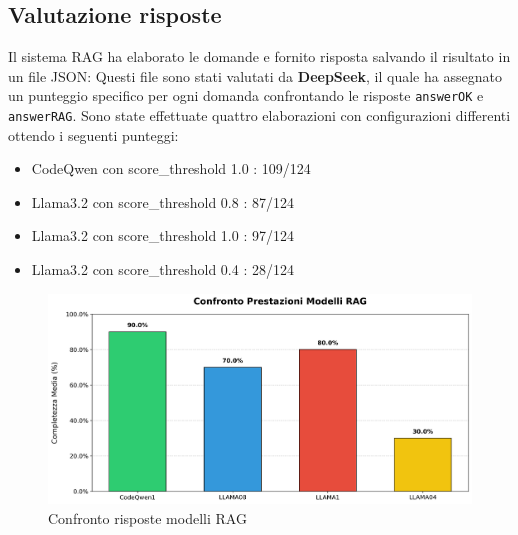 \documentclass[12pt,a4paper,openright,twoside]{book}
\begin{document}
\subsection{Valutazione risposte}
Il sistema RAG ha elaborato le domande e fornito risposta salvando il risultato in un file JSON:
Questi file sono stati valutati da \textbf{DeepSeek}, il quale ha assegnato un punteggio specifico per ogni domanda confrontando le risposte \texttt{answerOK} e \texttt{answerRAG}.
Sono state effettuate quattro elaborazioni con configurazioni differenti ottendo i seguenti punteggi:
\begin{itemize}
    \item CodeQwen con score\_threshold 1.0 : 109/124
    \item Llama3.2 con score\_threshold 0.8 : 87/124
    \item Llama3.2 con score\_threshold 1.0 : 97/124
    \item Llama3.2 con score\_threshold 0.4 : 28/124
\end{itemize}
\begin{figure}[h]
    \centering
    \includegraphics[width=\textwidth]{figures/confronto_valutazioni_modelli.png}
    \caption{Confronto risposte modelli RAG}
    \label{fig:confronto-modelli}
\end{figure}
\end{document}
